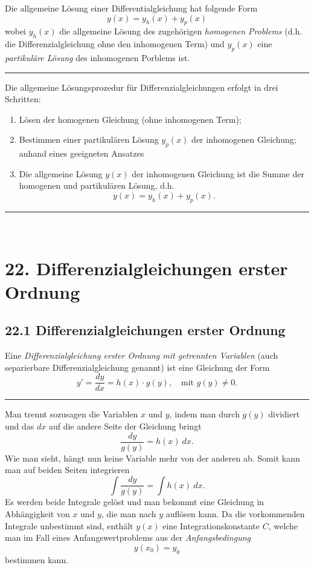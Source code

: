 \documentclass[a4paper,landscape,8pt]{extarticle}
\newcommand{\sep}{\vspace{5pt}\noindent\hrule\vspace{5pt}}
\renewcommand*{\newpage}{ \ }
\begin{document}
\begin{multicols*}{4}
Die allgemeine Lösung einer Differentialgleichung hat folgende Form
\[
y(x) = y_h(x) + y_p(x)
\]
wobei $y_h(x)$ die allgemeine Lösung des zugehörigen \emph{homogenen Problems}
(d.h. die Differenzialgleichung ohne den inhomogenen Term) und $y_p(x)$ eine
\emph{partikuläre Lösung} des inhomogenen Porblems ist.

\sep

\Vorgehen Die allgemeine Lösungsprozedur für Differenzialgleichungen erfolgt in
drei Schritten:

\begin{enumerate}[label=(\arabic*)]
  \item Lösen der homogenen Gleichung (ohne inhomogenen Term);
  \item Bestimmen einer partikulären Lösung $y_p(x)$ der inhomogenen Gleichung;
  anhand eines geeigneten Ansatzes
  \item Die allgemeine Lösung $y(x)$ der inhomogenen Gleichung ist die Summe der
  homogenen und partikulären Lösung, d.h.
  \[
  y(x) = y_h(x) + y_p(x).
  \]
\end{enumerate}

\sep

\newpage

\section{22. Differenzialgleichungen erster Ordnung}

\subsection{22.1 Differenzialgleichungen erster Ordnung}

\Def Eine \emph{Differenzialgleichung erster Ordnung mit getrennten Variablen}
(auch separierbare Differenzialgleichung genannt) ist eine Gleichung der Form
\[
y'=\frac{dy}{dx} = h(x)\cdot g(y),\quad \text{mit } g(y)\neq 0.
\]

\sep

\Vorgehen Man trennt sozusagen die Variablen $x$ und $y$, indem man durch $g(y)$
dividiert und das $dx$ auf die andere Seite der Gleichung bringt
\[
\frac{dy}{g(y)} = h(x) \ dx.
\]
Wie man sieht, hängt nun keine Variable mehr von der anderen ab. Somit kann man
auf beiden Seiten integrieren
\[
\int\frac{dy}{g(y)} = \int h(x) \ dx.
\]
Es werden beide Integrale gelöst und man bekommt eine Gleichung in Abhängigkeit
von $x$ und $y$, die man nach $y$ auflösen kann. Da die vorkommenden Integrale
unbestimmt sind, enthält $y(x)$ eine Integrationskonstante $C$, welche man im
Fall eines Anfangswertproblems aus der \emph{Anfangsbedingung}
\[
y(x_0) = y_0
\]
bestimmen kann.


\end{multicols*}
\end{document}
